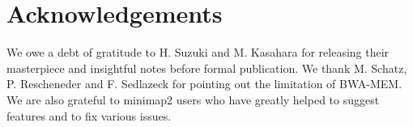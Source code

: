 \documentclass{bioinfo}
\begin{document}
\section*{Acknowledgements}
We owe a debt of gratitude to H. Suzuki and M. Kasahara for releasing their
masterpiece and insightful notes before formal publication. We thank M.
Schatz, P. Rescheneder and F. Sedlazeck for pointing out the limitation of
BWA-MEM. We are also grateful to minimap2 users who have greatly helped to
suggest features and to fix various issues.


\end{document}
